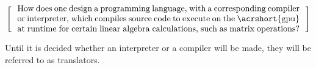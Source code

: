 \[
  \left[
  \begin{minipage}{\textwidth}
  \centering
  \begin{minipage}{0.96\textwidth}
  How does one design a programming language, with a corresponding compiler or interpreter, which compiles source code to execute on the \acrshort{gpu} at runtime for certain linear algebra calculations, such as matrix operations?
  
  



  \end{minipage}
  \end{minipage}
    \right]
\]

Until it is decided whether an interpreter or a compiler will be made, they will be referred to as translators.